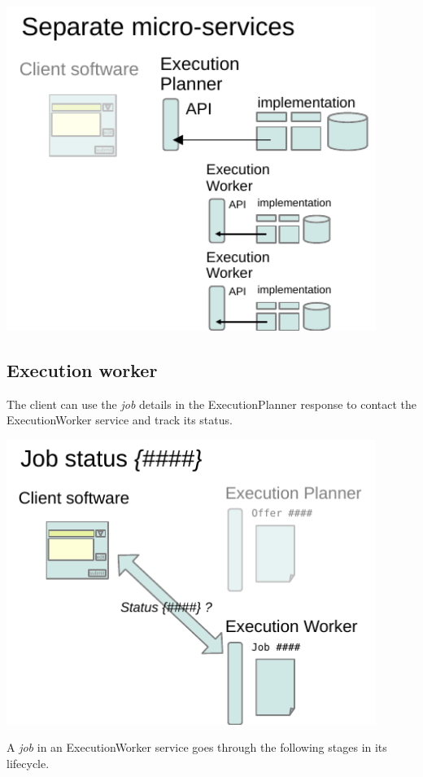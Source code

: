 \documentclass[11pt,a4paper]{ivoa}
\newcommand{\execplanner} {ExecutionPlanner}
\newcommand{\execworker} {ExecutionWorker}
\newcommand{\workerjob} {\textit{job}}
\begin{document}
\includegraphics[width=0.9\textwidth]{diagrams/micro-services.pdf}

\subsection{Execution worker}
\label{execution-worker-desc}

The client can use the \workerjob{} details in the \execplanner{} response to contact
the \execworker{} service and track its status.

\includegraphics[width=0.9\textwidth]{diagrams/job-status.pdf}

A \workerjob{} in an \execworker{} service goes through the following stages in its lifecycle.
\end{document}
